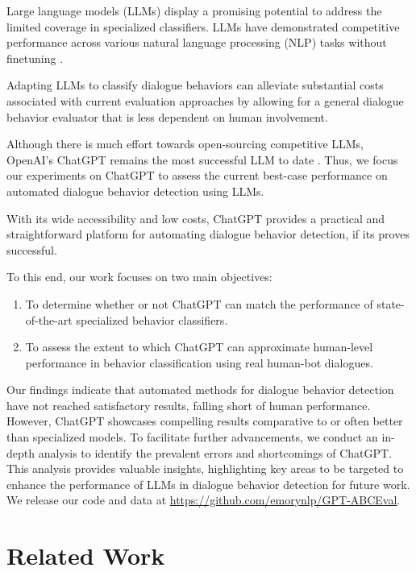 Large language models (LLMs) display a promising potential to address the limited coverage in specialized classifiers. LLMs have demonstrated competitive performance across various natural language processing (NLP) tasks without finetuning \cite{kocon:23}. 

Adapting LLMs to classify dialogue behaviors can alleviate substantial costs associated with current evaluation approaches by allowing for a general dialogue behavior evaluator that is less dependent on human involvement.

Although there is much effort towards open-sourcing competitive LLMs, OpenAI's ChatGPT remains the most successful LLM to date \cite{wang:23}. Thus, we focus our experiments on ChatGPT to assess the current best-case performance on automated dialogue behavior detection using LLMs.

With its wide accessibility and low costs, ChatGPT provides a practical and straightforward platform for automating dialogue behavior detection, if its proves successful.

 To this end, our work focuses on two main objectives:

\begin{enumerate}

\item To determine whether or not ChatGPT can match the performance of state-of-the-art specialized behavior classifiers.
\item To assess the extent to which ChatGPT can approximate human-level performance in behavior classification using real human-bot dialogues.
\end{enumerate}

 Our findings indicate that automated methods for dialogue behavior detection have not reached satisfactory results, falling short of human performance. However, ChatGPT showcases compelling results comparative to or often better than specialized models. To facilitate further advancements, we conduct an in-depth analysis to identify the prevalent errors and shortcomings of ChatGPT. This analysis provides valuable insights, highlighting key areas to be targeted to enhance the performance of LLMs in dialogue behavior detection for future work.   We release our code and data at \url{https://github.com/emorynlp/GPT-ABCEval}.

\section{Related Work}
\label{sec:rw}

